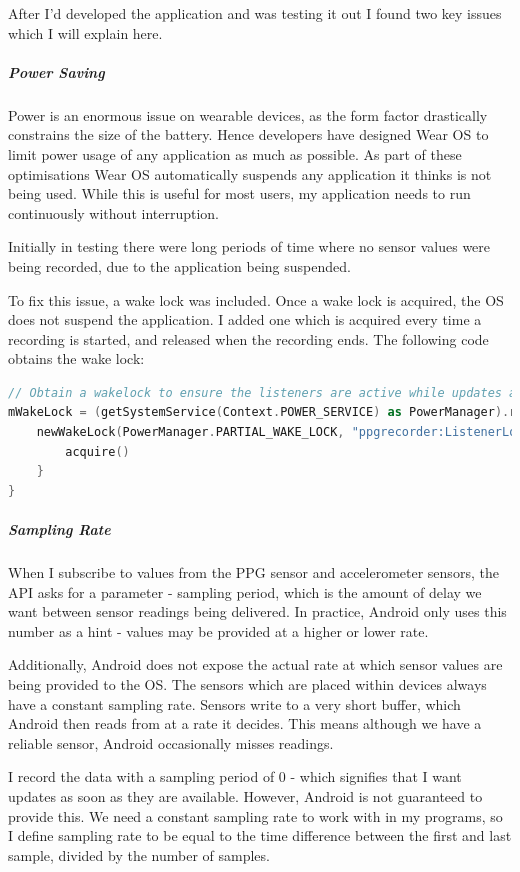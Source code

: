 \documentclass[12pt,a4paper,twoside,openany]{report}
\begin{document}
After I'd developed the application and was testing it out I found two key
issues which I will explain here.

\subparagraph{Power Saving}

Power is an enormous issue on wearable devices, as the form factor drastically
constrains the size of the battery. Hence developers have designed
Wear OS to limit power usage of any application as much as possible. 
As part of these optimisations Wear OS automatically suspends any application
it thinks is not being used. While this is useful for most users, my
application needs to run continuously without interruption.

Initially in testing there were long periods of time where no sensor values
were being recorded, due to the application being suspended.

To fix this issue, a wake lock was included. Once a wake lock is acquired, the
OS does not suspend the application. I added one which is acquired every time
a recording is started, and released when the recording ends. The following
code obtains the wake lock:

\begin{lstlisting}[language=Kotlin]
// Obtain a wakelock to ensure the listeners are active while updates are being provided
mWakeLock = (getSystemService(Context.POWER_SERVICE) as PowerManager).run {
	newWakeLock(PowerManager.PARTIAL_WAKE_LOCK, "ppgrecorder:ListenerLock").apply {
		acquire()
	}
}
\end{lstlisting}

\subparagraph{Sampling Rate}

When I subscribe to values from the PPG sensor and accelerometer sensors, the
API asks for a parameter - sampling period, which is the amount of delay we
want between sensor readings being delivered. In practice, Android only uses
this number as a hint - values may be provided at a higher or lower rate.

Additionally, Android does not expose the actual rate at which sensor values
are being provided to the OS. The sensors which are placed within devices
always have a constant sampling rate. Sensors write to a very short buffer,
which Android then reads from at a rate it decides. This means although we
have a reliable sensor, Android occasionally misses readings.

I record the data with a sampling period of 0 - which signifies that I want
updates as soon as they are available. However, Android is not guaranteed to
provide this. We need a constant sampling rate to work with in my programs, so I 
define sampling rate to be equal to the time difference
between the first and last sample, divided by the number of samples.
\end{document}
